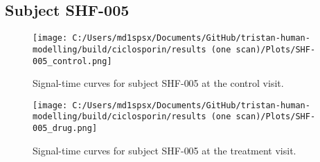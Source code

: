 \documentclass{epflreport}%
\begin{document}
\subsection{Subject SHF{-}005}%
\label{subsec:SubjectSHF{-}005}%

%


\begin{figure}[h!]%
\centering%
\texttt{[image: C:/Users/md1spsx/Documents/GitHub/tristan-human-modelling/build/ciclosporin/results (one scan)/Plots/SHF-005\_control.png]}%
\caption{Signal{-}time curves for subject SHF{-}005 at the control visit.}%
\end{figure}

%


\begin{figure}[h!]%
\centering%
\texttt{[image: C:/Users/md1spsx/Documents/GitHub/tristan-human-modelling/build/ciclosporin/results (one scan)/Plots/SHF-005\_drug.png]}%
\caption{Signal{-}time curves for subject SHF{-}005 at the treatment visit.}%
\end{figure}
\end{document}
